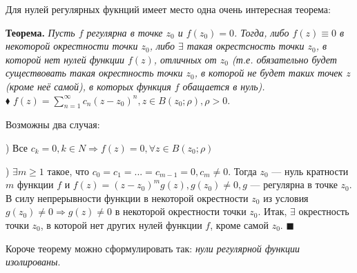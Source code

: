 \documentclass[a4paper, 12pt]{report}
\begin{document}
Для нулей регулярных фукнций имеет место одна очень интересная теорема: 
\par\bigskip
\textbf{Теорема.} \quad
\textit{Пусть $f$ регулярна в точке $z_0$ и $f(z_0) = 0$. Тогда, либо $f(z) \equiv 0$ в некоторой окрестности точки $z_0$, либо $\exists$ такая окрестсность точки $z_0$, в которой нет нулей функции $f(z)$, отличных от $z_0$ (т.е. обязательно будет существовать такая окрестность точки $z_0$, в которой не будет таких точек $z$ (кроме неё самой), в которых функция $f$ обащается в нуль).}\\
$\blacklozenge$ \hspace{1 mm} $f(z) = \sum\limits_{n=1}^{\infty}c_n(z - z_0)^n, z \in B(z_0; \rho), \rho > 0$.
\par\bigskip
Возможны два случая:
\par{}) Все $c_k = 0, k \in N \Rightarrow f(z) = 0, \forall z \in B(z_0; \rho)$
\par{}) $\exists m \geq 1$ такое, что $c_0 = c_1 = ... = c_{m-1} = 0, c_m \ne 0$. Тогда $z_0$ --- нуль кратности $m$ функции $f$ и $f(z) = (z - z_0)^m g(z), g(z_0) \ne 0, g$ --- регулярна в точке $z_0$. В силу непрерывности функции в некоторой окрестности $z_0$ из условия $g(z_0) \ne 0 \Rightarrow g(z) \ne 0$ в некоторой окрестности точки $z_0$. Итак, $\exists$ окрестность точки $z_0$, в которой нет других нулей функции $f$, кроме самой $z_0$. \quad $\blacksquare$ 
\par\bigskip
Короче теорему можно сформулировать так: \textit{нули регулярной функции изолированы}.
\end{document}
